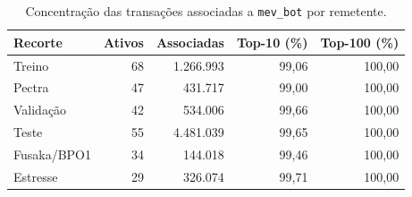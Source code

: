 \begin{table}[htbp]
\centering\small
\caption{Concentração das transações associadas a \texttt{mev\_bot} por remetente.}
\label{tab:concentracao-remetentes}
\begin{tabular}{@{}lrrrr@{}}
\toprule
Recorte & Ativos & Associadas & Top-10 (\%) & Top-100 (\%) \\
\midrule
Treino & 68 & 1.266.993 & 99,06 & 100,00 \\
Pectra & 47 & 431.717 & 99,00 & 100,00 \\
Validação & 42 & 534.006 & 99,66 & 100,00 \\
Teste & 55 & 4.481.039 & 99,65 & 100,00 \\
Fusaka/BPO1 & 34 & 144.018 & 99,46 & 100,00 \\
Estresse & 29 & 326.074 & 99,71 & 100,00 \\
\bottomrule
\end{tabular}
\end{table}
